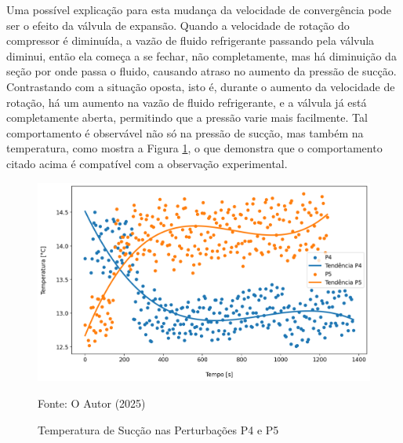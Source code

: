 Uma possível explicação para esta mudança da velocidade de convergência pode ser o efeito da válvula de expansão. Quando a velocidade de rotação do compressor é diminuída, a vazão de fluido refrigerante passando pela válvula diminui, então ela começa a se fechar, não completamente, mas há diminuição da seção por onde passa o fluido, causando atraso no aumento da pressão de sucção. Contrastando com a situação oposta, isto é, durante o aumento da velocidade de rotação, há um aumento na vazão de fluido refrigerante, e a válvula já está completamente aberta, permitindo que a pressão varie mais facilmente. Tal comportamento é observável não só na pressão de sucção, mas também na temperatura, como mostra a Figura \ref{fig:TempSucçãoSubidaeDescida}, o que demonstra que o comportamento citado acima é compatível com a observação experimental.
\newpage
\begin{figure}[h]
    \centering
    \includegraphics[width=1\linewidth]{FigurasdoTexto/Temperatura de Sucçãohyst.png}
    \caption{Temperatura de Sucção  nas Perturbações P4 e P5}
    \label{fig:TempSucçãoSubidaeDescida}
    {\footnotesize Fonte: O Autor (2025)}
\end{figure}

